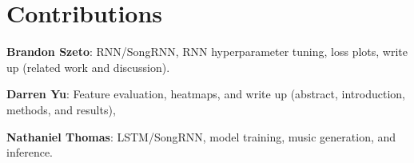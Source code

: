 \section*{Contributions}

\textbf{Brandon Szeto}: RNN/SongRNN, RNN hyperparameter tuning, loss plots, write up (related work and discussion).

\textbf{Darren Yu}: Feature evaluation, heatmaps, and write up (abstract, introduction, methods, and results), 

\textbf{Nathaniel Thomas}: LSTM/SongRNN, model training, music generation, and inference.
